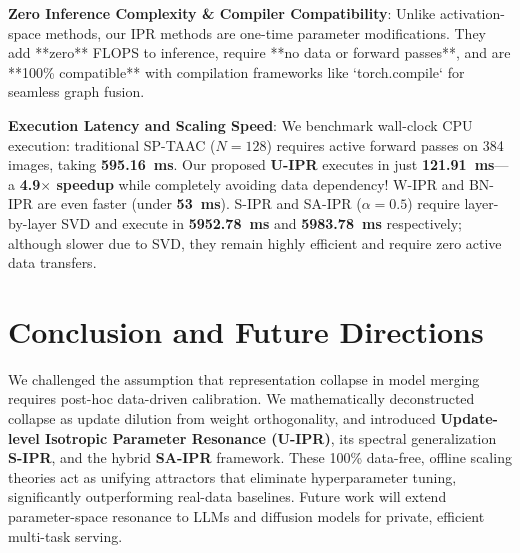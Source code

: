\documentclass{article}
\begin{document}
\textbf{Zero Inference Complexity \& Compiler Compatibility}: Unlike activation-space methods, our IPR methods are one-time parameter modifications. They add **zero** FLOPS to inference, require **no data or forward passes**, and are **100\% compatible** with compilation frameworks like `torch.compile` for seamless graph fusion.

\textbf{Execution Latency and Scaling Speed}: We benchmark wall-clock CPU execution: traditional SP-TAAC ($N=128$) requires active forward passes on 384 images, taking \textbf{595.16~ms}. Our proposed \textbf{U-IPR} executes in just \textbf{121.91~ms}---a \textbf{4.9$\times$ speedup} while completely avoiding data dependency! W-IPR and BN-IPR are even faster (under \textbf{53~ms}). S-IPR and SA-IPR ($\alpha=0.5$) require layer-by-layer SVD and execute in \textbf{5952.78~ms} and \textbf{5983.78~ms} respectively; although slower due to SVD, they remain highly efficient and require zero active data transfers.

\section{Conclusion and Future Directions}
\label{sec:conclusion}
We challenged the assumption that representation collapse in model merging requires post-hoc data-driven calibration. We mathematically deconstructed collapse as update dilution from weight orthogonality, and introduced \textbf{Update-level Isotropic Parameter Resonance (U-IPR)}, its spectral generalization \textbf{S-IPR}, and the hybrid \textbf{SA-IPR} framework. These 100\% data-free, offline scaling theories act as unifying attractors that eliminate hyperparameter tuning, significantly outperforming real-data baselines. Future work will extend parameter-space resonance to LLMs and diffusion models for private, efficient multi-task serving.




\newpage
\appendix
\onecolumn
{}
\end{document}
